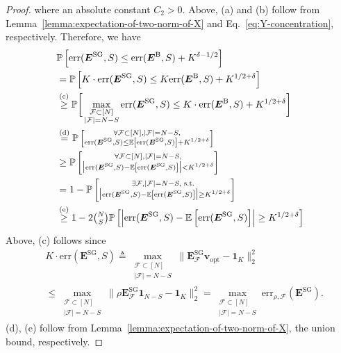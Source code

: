 \documentclass[lettersize,journal]{IEEEtran}
\newcommand{\err}[1]{\mathrm{err}(#1, S)}
\newcommand{\ones}[1]{\boldsymbol{1}_{#1}}
\newcommand{\F}{\mathcal{F}}
\newcommand{\vopt}{\boldsymbol{v}_{\mathrm{opt}}}
\newcommand{\GSG}{\boldsymbol{E}^{\mathrm{SG}}}
\newcommand{\GB}{\boldsymbol{E}^{\mathrm{B}}}
\newcommand{\prob}[1]{\mathbb{P}\left[#1\right]}
\newcommand{\ex}[1]{\mathbb{E}\left[#1\right]}
\newcommand{\errc}{\mathrm{err}_{\rho,\F}(\GSG)}
\begin{document}
{\begin{proof}
where an absolute constant $C_2>0$. Above, (a) and (b) follow from Lemma~\ref{lemma:expectation-of-two-norm-of-X} and Eq.~\eqref{eq:Y-concentration}, respectively. Therefore, we have
\begin{align}
    &\prob{\err{\GSG}\leq \err{\GB} + K^{\delta-1/2}} \notag\\
    &= \prob{K\cdot \err{\GSG}\leq K\err{\GB} + K^{1/2+\delta}}\notag\\
    &\overset{\mathrm{(c)}}{\ge} \mathbb{P}\bigg[\max_{\substack{\F\subset[N]\\|\F| = N-S}} \err{\GSG}  \leq K\cdot\err{\GB} + K^{1/2+\delta}\bigg]\notag\\
    &\overset{\mathrm{(d)}}{=} 
    \prob{\substack{
    \forall \F\subset [N], |\F| = N-S,\\
    \err{\GSG}  \le \ex{\err{\GSG}} + K^{1/2+\delta}}}\notag\\
    &\ge\prob{\substack{
    \forall \F\subset [N], |\F| = N-S,\\
    \big|\err{\GSG} - \ex{\err{\GSG} }\big| < K^{1/2+\delta}}}\notag\\
    &= 1-\prob{\substack{
    \exists \F, |\F| = N-S, \text{ s.t. }\\
    \big|\err{\GSG}  - \ex{\err{\GSG} }\big| \ge K^{1/2+\delta}}}\notag\\
    &\overset{\mathrm{(e)}}{\ge} 1- 2\tbinom{N}{S}\prob{\left|\err{\GSG} - \ex{\err{\GSG} }\right| \geq K^{1/2+\delta}}
    \label{eq:error-for-all}
\end{align}
Above, (c) follows since 
\begin{align*}
    & K\cdot\err{\GSG} \triangleq \max_{\substack{\F\subset[N]\\|\F| = N-S}}
\|\GSG_{\F}\vopt - \ones{K}\|_2^2 \\
&\le \max_{\substack{\F\subset[N]\\|\F| = N-S}}
\|\rho\GSG_{\F}\ones{N-S}-\ones{K}\|_2^2 =\max_{\substack{\F\subset[N]\\|\F| = N-S}} \errc.
\end{align*}
(d), (e) 
follow from Lemma~\ref{lemma:expectation-of-two-norm-of-X}, the union bound, 
respectively.


\end{proof}}
\end{document}
